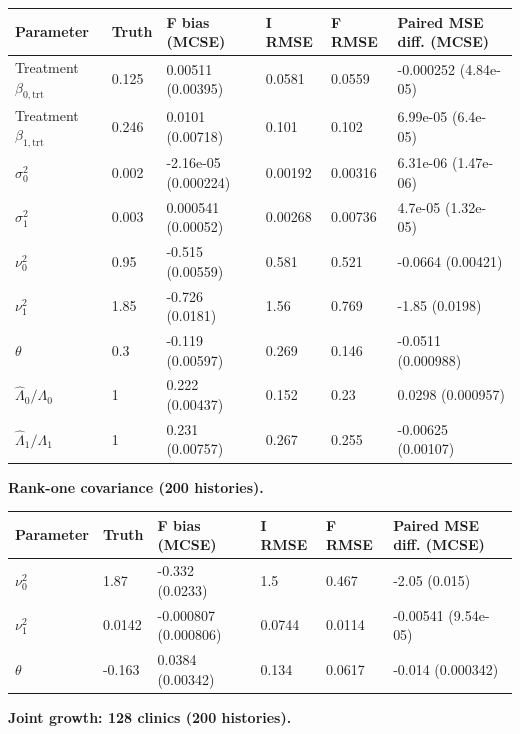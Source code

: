 \documentclass[11pt]{article}
\begin{document}
{\scriptsize
\begin{longtable}{llllll}
\toprule
\textbf{Parameter} & \textbf{Truth} & \textbf{F bias (MCSE)} & \textbf{I RMSE} & \textbf{F RMSE} & \textbf{Paired MSE diff. (MCSE)} \\
\midrule
\endhead
\bottomrule
\endlastfoot
Treatment \(\beta_{0,\mathrm{trt}}\) & 0.125 & 0.00511 (0.00395) & 0.0581 & 0.0559 & -0.000252 (4.84e-05) \\
Treatment \(\beta_{1,\mathrm{trt}}\) & 0.246 & 0.0101 (0.00718) & 0.101 & 0.102 & 6.99e-05 (6.4e-05) \\
\(\sigma_0^2\) & 0.002 & -2.16e-05 (0.000224) & 0.00192 & 0.00316 & 6.31e-06 (1.47e-06) \\
\(\sigma_1^2\) & 0.003 & 0.000541 (0.00052) & 0.00268 & 0.00736 & 4.7e-05 (1.32e-05) \\
\(\nu_0^2\) & 0.95 & -0.515 (0.00559) & 0.581 & 0.521 & -0.0664 (0.00421) \\
\(\nu_1^2\) & 1.85 & -0.726 (0.0181) & 1.56 & 0.769 & -1.85 (0.0198) \\
\(\theta\) & 0.3 & -0.119 (0.00597) & 0.269 & 0.146 & -0.0511 (0.000988) \\
\(\widehat\Lambda_0/\Lambda_0\) & 1 & 0.222 (0.00437) & 0.152 & 0.23 & 0.0298 (0.000957) \\
\(\widehat\Lambda_1/\Lambda_1\) & 1 & 0.231 (0.00757) & 0.267 & 0.255 & -0.00625 (0.00107) \\
\end{longtable}}

\textbf{Rank-one covariance (200 histories).}

{\small
\begin{longtable}{llllll}
\toprule
\textbf{Parameter} & \textbf{Truth} & \textbf{F bias (MCSE)} & \textbf{I RMSE} & \textbf{F RMSE} & \textbf{Paired MSE diff. (MCSE)} \\
\midrule
\endhead
\bottomrule
\endlastfoot
\(\nu_0^2\) & 1.87 & -0.332 (0.0233) & 1.5 & 0.467 & -2.05 (0.015) \\
\(\nu_1^2\) & 0.0142 & -0.000807 (0.000806) & 0.0744 & 0.0114 & -0.00541 (9.54e-05) \\
\(\theta\) & -0.163 & 0.0384 (0.00342) & 0.134 & 0.0617 & -0.014 (0.000342) \\
\end{longtable}}

\textbf{Joint growth: 128 clinics (200 histories).}
\end{document}
